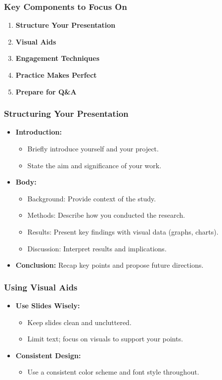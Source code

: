 \documentclass[aspectratio=169]{beamer}
\begin{document}
\begin{frame}[fragile]
    \frametitle{Key Components to Focus On}
    \begin{enumerate}
        \item \textbf{Structure Your Presentation}
        \item \textbf{Visual Aids}
        \item \textbf{Engagement Techniques}
        \item \textbf{Practice Makes Perfect}
        \item \textbf{Prepare for Q\&A}
    \end{enumerate}
\end{frame}

\begin{frame}[fragile]
    \frametitle{Structuring Your Presentation}
    \begin{itemize}
        \item \textbf{Introduction:} 
            \begin{itemize}
                \item Briefly introduce yourself and your project.
                \item State the aim and significance of your work.
            \end{itemize}
        \item \textbf{Body:} 
            \begin{itemize}
                \item Background: Provide context of the study.
                \item Methods: Describe how you conducted the research.
                \item Results: Present key findings with visual data (graphs, charts).
                \item Discussion: Interpret results and implications.
            \end{itemize}
        \item \textbf{Conclusion:} Recap key points and propose future directions.
    \end{itemize}
\end{frame}

\begin{frame}[fragile]
    \frametitle{Using Visual Aids}
    \begin{itemize}
        \item \textbf{Use Slides Wisely:} 
            \begin{itemize}
                \item Keep slides clean and uncluttered.
                \item Limit text; focus on visuals to support your points.
            \end{itemize}
        \item \textbf{Consistent Design:} 
            \begin{itemize}
                \item Use a consistent color scheme and font style throughout.
            \end{itemize}
    \end{itemize}
\end{frame}
\end{document}
